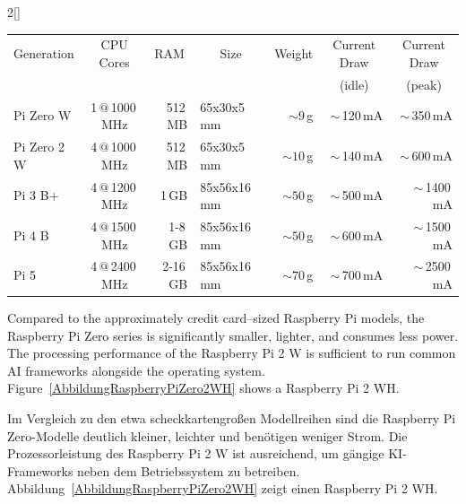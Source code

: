 \begin{paracol}{2}[]
\begin{table}[htb!]
\centering
{}
\label{TabelleRaspberryPiUnterschiede}
\setlength{\tabcolsep}{5pt} %
\renewcommand{\arraystretch}{1.0} %
\begin{tabular}{lcrlrrr}
\toprule
Generation   & CPU Cores   & \multicolumn{1}{c}{RAM}       & \multicolumn{1}{c}{Size}    &  \multicolumn{1}{c}{Weight}  & \multicolumn{1}{c}{Current Draw} & \multicolumn{1}{c}{Current Draw} \\
                       &               &     &      &      & \multicolumn{1}{c}{(idle)} &  \multicolumn{1}{c}{(peak)} \\
\midrule
Pi Zero W    & 1\,\(@\)\,1000\,MHz  & 512\,MB  & 65x30x5\,mm   & \(\sim 9\)\,g  & \(\sim\)\,120\,mA & \(\sim\)\,350\,mA \\
Pi Zero 2 W  & 4\,\(@\)\,1000\,MHz  & 512\,MB  & 65x30x5\,mm   & \(\sim 10\)\,g & \(\sim\)\,140\,mA & \(\sim\)\,600\,mA \\
Pi 3 B+      & 4\,\(@\)\,1200\,MHz  & 1\,GB    & 85x56x16\,mm  & \(\sim 50\)\,g & \(\sim\)\,500\,mA & \(\sim\)\,1400\,mA \\
Pi 4 B       & 4\,\(@\)\,1500\,MHz  & 1-8\,GB  & 85x56x16\,mm  & \(\sim 50\)\,g & \(\sim\)\,600\,mA & \(\sim\)\,1500\,mA \\
Pi 5         & 4\,\(@\)\,2400\,MHz  & 2-16\,GB & 85x56x16\,mm  & \(\sim 70\)\,g & \(\sim\)\,700\,mA & \(\sim\)\,2500\,mA \\
\bottomrule
\end{tabular}
\end{table}
\FloatBarrier

\colstart

Compared to the approximately credit card--sized Raspberry Pi models, the Raspberry Pi Zero series is significantly smaller, lighter, and consumes less power. The processing performance of the Raspberry Pi 2 W is sufficient to run common AI frameworks alongside the operating system. Figure~\ref{AbbildungRaspberryPiZero2WH} shows a Raspberry Pi 2 WH.

\colger

Im Vergleich zu den etwa scheckkartengroßen Modellreihen sind die Raspberry Pi Zero-Modelle deutlich kleiner, leichter und benötigen weniger Strom. Die Prozessorleistung des Raspberry Pi 2 W ist ausreichend, um gängige KI-Frameworks neben dem Betriebssystem zu betreiben. Abbildung~\ref{AbbildungRaspberryPiZero2WH} zeigt einen Raspberry Pi 2 WH.


\end{paracol}
